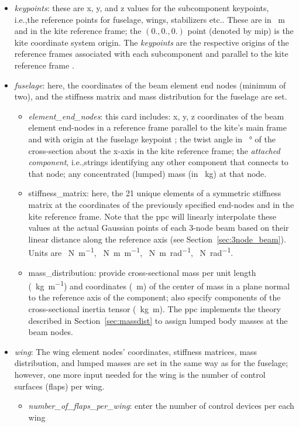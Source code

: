 \documentclass[report]{nrel}
\def\ie{i.e., }
\def\ie{i.e.,}
\begin{document}
\begin{itemize}
%
	\item \emph{keypoints}: these are x, y, and z values for the subcomponent keypoints, \ie the reference points for fuselage, wings, stabilizers etc.. These are in \SI{}{\m} and in the kite reference frame; the $(0.,0.,0.)$ point (denoted by \gls{mip}) is the kite coordinate system origin. The \emph{keypoints} are the respective origins of the reference frames associated with each subcomponent and parallel to the kite reference frame \cite{jonkman2018}.
	\item \emph{fuselage}: here, the coordinates of the beam element end nodes (minimum of two), and the stiffness matrix and mass distribution for the fuselage are set.
	\begin{itemize}
		\item \emph{element\_end\_nodes}: this card includes: x, y, z coordinates of the beam element end-nodes in a reference frame parallel to the kite's main frame and with origin at the fuselage keypoint ; the twist angle in \SI{}{\degree} of the cross-section about the x-axis in the kite reference frame; the \emph{attached component}, \ie strings identifying any other component that connects to that node; any concentrated (lumped) mass (in \SI{}{\kg}) at that node.
		\item {stiffness\_matrix}: here, the 21 unique elements of a symmetric stiffness matrix at the coordinates of the previously specified end-nodes and in the kite reference frame. Note that the \gls{ppc} will linearly interpolate these values at the actual Gaussian points of each 3-node beam based on their linear distance along the reference axis (see Section~\ref{sec:3node_beam}).  Units are \SI{}{\N\per\m}, \SI{}{\N\m\per\m}, \SI{}{\N\m\per\radian}, \SI{}{\N\per\radian}.
		\item {mass\_distribution}: provide cross-sectional mass per unit length (\SI{}{\kg\per\m}) and coordinates (\SI{}{\m}) of the center of mass in a plane normal to the reference axis of the component; also specify components of the cross-sectional inertia tensor (\SI{}{\kg\m}). The \gls{ppc} implements the theory described in Section~\ref{sec:massdist} to assign lumped body masses at the beam nodes.
		
	\end{itemize}

%
	\item \emph{wing}: The wing element nodes' coordinates, stiffness matrices, mass distribution, and lumped masses are set in the same way as for the fuselage; however, one more input  needed for the wing is the number of control surfaces (flaps) per wing.
		\begin{itemize}
			\item \emph{number\_of\_flaps\_per\_wing}: enter the number of control devices per each wing
	

\end{itemize}
\end{itemize}
\end{document}
